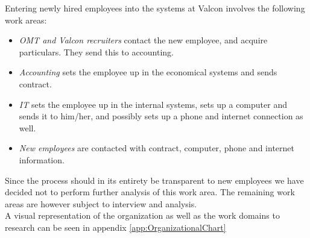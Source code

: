 Entering newly hired employees into the systems at Valcon involves the following work areas:

\begin{itemize}
\item \emph{OMT and Valcon recruiters} contact the new employee, and acquire particulars. They send this to accounting.
\item \emph{Accounting} sets the employee up in the economical systems and sends contract.
\item \emph{IT} sets the employee up in the internal systems, sets up a computer and sends it to him/her, and possibly sets up a phone and internet connection as well.
\item \emph{New employees} are contacted with contract, computer, phone and internet information. 
\end{itemize}

Since the process should in its entirety be transparent to new employees we have decided not to perform further analysis of this work area.
The remaining work areas are however subject to interview and analysis. \\

A visual representation of the organization as well as the work domains to research can be seen in appendix \ref{app:OrganizationalChart}